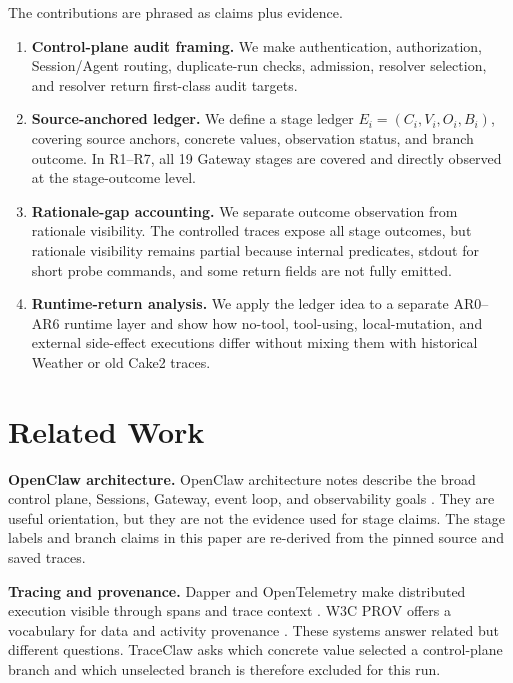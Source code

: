 \documentclass[11pt,a4paper]{article}
\begin{document}
The contributions are phrased as claims plus evidence.

\begin{enumerate}
    \item \textbf{Control-plane audit framing.} We make authentication,
    authorization, Session/Agent routing, duplicate-run checks, admission,
    resolver selection, and resolver return first-class audit targets.

    \item \textbf{Source-anchored ledger.} We define a stage ledger
    \(E_i=(C_i,V_i,O_i,B_i)\), covering source anchors, concrete values,
    observation status, and branch outcome. In R1--R7, all 19 Gateway
    stages are covered and directly observed at the stage-outcome level.

    \item \textbf{Rationale-gap accounting.} We separate outcome
    observation from rationale visibility. The controlled traces expose
    all stage outcomes, but rationale visibility remains partial because
    internal predicates, stdout for short probe commands, and some return
    fields are not fully emitted.

    \item \textbf{Runtime-return analysis.} We apply the ledger idea to a
    separate AR0--AR6 runtime layer and show how no-tool, tool-using,
    local-mutation, and external side-effect executions differ without
    mixing them with historical Weather or old Cake2 traces.
\end{enumerate}

\section{Related Work}
\label{sec:related-work}

\textbf{OpenClaw architecture.}
OpenClaw architecture notes describe the broad control plane, Sessions,
Gateway, event loop, and observability goals
\cite{openclawPart1,openclawPart6,openclawExplained}. They are useful
orientation, but they are not the evidence used for stage claims. The
stage labels and branch claims in this paper are re-derived from the
pinned source and saved traces.

\textbf{Tracing and provenance.}
Dapper and OpenTelemetry make distributed execution visible through
spans and trace context \cite{dapper2010,opentelemetryTrace}. W3C PROV
offers a vocabulary for data and activity provenance \cite{provDM}. These
systems answer related but different questions. TraceClaw asks which
concrete value selected a control-plane branch and which unselected
branch is therefore excluded for this run.
\end{document}
